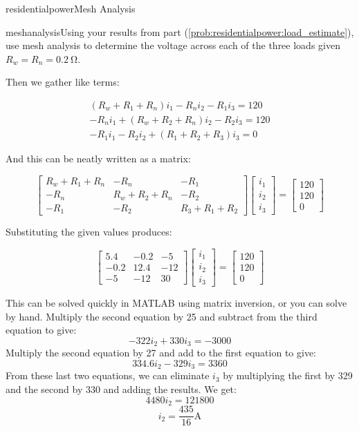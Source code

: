 \begin{mainquestion}{residentialpower}{Mesh Analysis}
\begin{partquestion}{meshanalysis}{Using your results from part (\cref{prob:residentialpower:load_estimate}), use mesh analysis to determine the voltage across each of the three loads given $R_{w}=R_{n}=\qty{0.2}{\ohm}$.}
\begin{answer}
Then we gather like terms:

\begin{gather*}
(R_w + R_1 + R_n)i_1 - R_n i_2 - R_1 i_3 = 120 \\
- R_n i_1 + (R_w + R_2 + R_n)i_2 - R_2 i_3 = 120 \\
- R_1 i_1 - R_2 i_2 + (R_1 + R_2 + R_3)i_3 = 0
\end{gather*}

And this can be neatly written as a matrix:

\[
\begin{bmatrix}
R_w + R_1 + R_n & -R_n & -R_1 \\
-R_n & R_w + R_2 + R_n & -R_2 \\
-R_1 & -R_2 & R_3 + R_1 + R_2
\end{bmatrix}
\begin{bmatrix}
i_1 \\
i_2 \\
i_3
\end{bmatrix}
=
\begin{bmatrix}
120 \\
120 \\
0
\end{bmatrix}
\]

Substituting the given values produces:

\[
\begin{bmatrix}
5.4 & -0.2 & -5 \\
-0.2 & 12.4 & -12 \\
-5 & -12 & 30
\end{bmatrix}
\begin{bmatrix}
i_1 \\
i_2 \\
i_3
\end{bmatrix}
=
\begin{bmatrix}
120 \\
120 \\
0
\end{bmatrix}
\]

This can be solved quickly in MATLAB using matrix inversion, or you can solve by hand. Multiply the second equation by 25 and subtract from the third equation to give:
\[-322i_2+330i_3=-3000\]
Multiply the second equation by 27 and add to the first equation to give:
\[334.6i_2-329i_3=3360\]
From these last two equations, we can eliminate $i_3$ by multiplying the first by 329 and the second by 330 and adding the results.  We get:
\[4480i_2 = 121800\]\[i_2 = \frac{435}{16}\unit{\ampere}\]
	  

\end{answer}
\end{partquestion}
\end{mainquestion}

